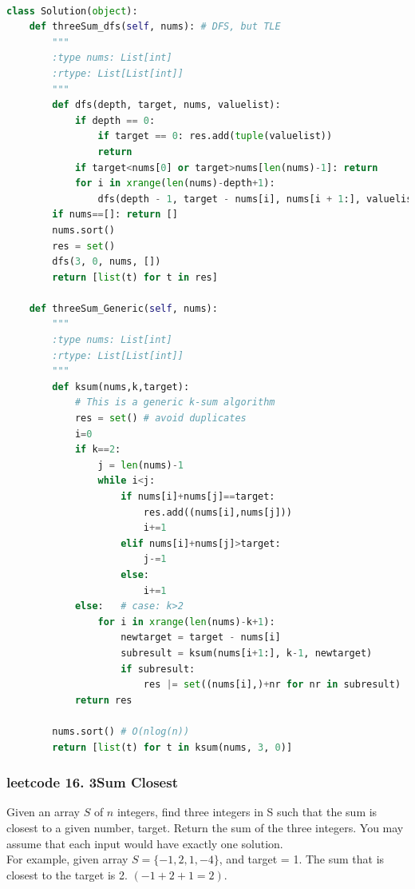 \documentclass[a4paper,10pt]{article}
\begin{document}
\begin{lstlisting}[language=Python, caption=Problem15. 3Sum]

class Solution(object):
    def threeSum_dfs(self, nums): # DFS, but TLE
        """
        :type nums: List[int]
        :rtype: List[List[int]]
        """
        def dfs(depth, target, nums, valuelist):
            if depth == 0:
                if target == 0: res.add(tuple(valuelist))
                return
            if target<nums[0] or target>nums[len(nums)-1]: return
            for i in xrange(len(nums)-depth+1):
                dfs(depth - 1, target - nums[i], nums[i + 1:], valuelist + [nums[i]])
        if nums==[]: return []
        nums.sort()
        res = set()
        dfs(3, 0, nums, [])
        return [list(t) for t in res]
        
    def threeSum_Generic(self, nums):
        """
        :type nums: List[int]
        :rtype: List[List[int]]
        """
        def ksum(nums,k,target):
            # This is a generic k-sum algorithm
            res = set() # avoid duplicates
            i=0
            if k==2:
                j = len(nums)-1
                while i<j:
                    if nums[i]+nums[j]==target:
                        res.add((nums[i],nums[j]))
                        i+=1
                    elif nums[i]+nums[j]>target:
                        j-=1
                    else:
                        i+=1
            else:   # case: k>2
                for i in xrange(len(nums)-k+1):
                    newtarget = target - nums[i]
                    subresult = ksum(nums[i+1:], k-1, newtarget)
                    if subresult:
                        res |= set((nums[i],)+nr for nr in subresult)
            return res
        
        nums.sort() # O(nlog(n))
        return [list(t) for t in ksum(nums, 3, 0)]
\end{lstlisting}

\subsubsection{leetcode 16. 3Sum Closest}
Given an array $S$ of $n$ integers, find three integers in S such that the sum is closest to a given number, target. Return the sum of the three integers. You may assume that each input would have exactly one solution. \\

\noindent For example, given array $S = \{-1,2,1,-4\}$, and target = 1.
The sum that is closest to the target is 2. $(-1 + 2 + 1 = 2)$. \\
\end{document}
